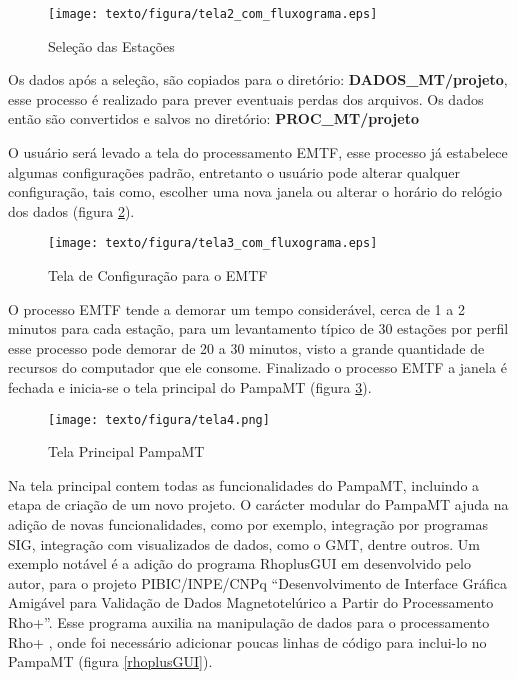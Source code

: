     \begin{figure}[H]
        \caption{Seleção das Estações}
            \begin{center}
                \texttt{[image: texto/figura/tela2\_com\_fluxograma.eps]}
            \end{center}
        \label{tela_sel_site}
    \end{figure}
    
    Os dados após a seleção, são copiados para o diretório: \textbf{DADOS\_MT/projeto}, esse processo é realizado para prever eventuais perdas dos arquivos. Os dados então são convertidos e salvos no diretório: \textbf{PROC\_MT/projeto} 
    
    O usuário será levado a tela do processamento EMTF, esse processo já estabelece algumas configurações padrão, entretanto o usuário pode alterar qualquer configuração, tais como, escolher uma nova janela ou alterar o horário do relógio dos dados (figura \ref{conf-procZ}).
    
    \begin{figure}[H]
        \caption{Tela de Configuração para o EMTF}
            \begin{center}
                \texttt{[image: texto/figura/tela3\_com\_fluxograma.eps]}
            \end{center}
        \label{conf-procZ}
    \end{figure}
    
    O processo EMTF tende a demorar um tempo considerável, cerca de 1 a 2 minutos para cada estação, para um levantamento típico de 30 estações por perfil esse processo pode demorar de 20 a 30 minutos, visto a grande quantidade de recursos do computador que ele consome. Finalizado o processo EMTF a janela é fechada e inicia-se o tela principal do PampaMT (figura \ref{tela-prin}).
    
    \begin{figure}[H]
        \caption{Tela Principal PampaMT}
            \begin{center}
                \texttt{[image: texto/figura/tela4.png]}
            \end{center}
        \label{tela-prin}
    \end{figure}
    
    
    Na tela principal contem todas as funcionalidades do PampaMT, incluindo a etapa de criação de um novo projeto. O carácter modular do PampaMT ajuda na adição de novas funcionalidades, como por exemplo, integração por programas SIG, integração com visualizados de dados, como o GMT, dentre outros. Um exemplo notável é a adição do programa RhoplusGUI em desenvolvido pelo autor, para o projeto PIBIC/INPE/CNPq ``Desenvolvimento de Interface Gráfica Amigável para Validação de Dados Magnetotelúrico a Partir do Processamento Rho+''. Esse programa auxilia na manipulação de dados para o processamento Rho+ \cite{parker1996optimal}, onde foi necessário adicionar poucas linhas de código para inclui-lo no PampaMT (figura \ref{rhoplusGUI}).
    
